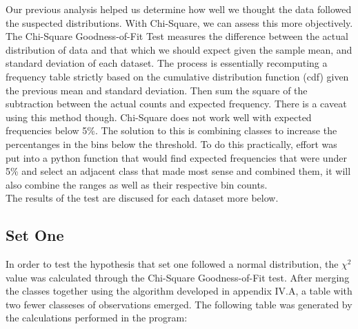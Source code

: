 \documentclass[10pt]{report}
\begin{document}
Our previous analysis helped us determine how well we thought the data followed the suspected distributions.
With Chi-Square, we can assess this more objectively. The Chi-Square Goodness-of-Fit Test measures
the difference between the actual distribution of data and that which we should expect given the sample mean, and standard
deviation of each dataset. The process is essentially recomputing a frequency table strictly based on the cumulative
distribution function (cdf) given the previous mean and standard deviation. Then sum the square of the subtraction between
the actual counts and expected frequency. There is a caveat using this method though. Chi-Square does not work well with 
expected frequencies below 5\%. The solution to this is combining classes to increase the percentanges in the bins below
the threshold. To do this practically, effort was put into a python function that would find expected frequencies that
were under 5\% and select an adjacent class that made most sense and combined them, it will also combine the ranges as well
as their respective bin counts. \\
The results of the test are discused for each dataset more below.

\subsection*{Set One}

In order to test the hypothesis that set one followed a normal distribution, the $\chi^2$ value was calculated
through the Chi-Square Goodness-of-Fit test.
After merging the classes together using the algorithm developed in appendix IV.A, a table with two fewer classeses
of observations emerged. The following table was generated by the calculations performed in the program: 
\end{document}
